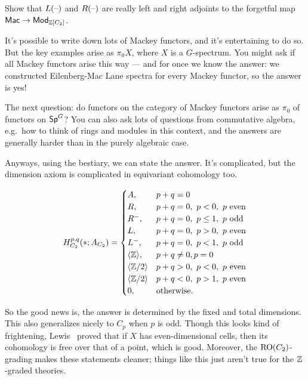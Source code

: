 \begin{ex}
Show that $L(\text{--})$ and $R(\text{--})$ are really left and right adjoints to the forgetful map
$\mathsf{Mac}\to\mathsf{Mod}_{\mathbb Z[C_2]}$.
\end{ex}
It's possible to write down lots of Mackey functors, and it's entertaining to do so. But the key examples arise as
$\pi_0 X$, where $X$ is a $G$-spectrum. You might ask if all Mackey functors arise this way --- and for once we
know the answer: we constructed Eilenberg-Mac Lane spectra for every Mackey functor, so the answer is yes!

The next question: do functors on the category of Mackey functors arise as $\pi_0$ of functors on $\mathsf{Sp}^G$? You can
also ask lots of questions from commutative algebra, e.g.\ how to think of rings and modules in this context, and
the answers are generally harder than in the purely algebraic case.

Anyways, using the bestiary, we can state the answer. It's complicated, but the dimension axiom is complicated in
equivariant cohomology too.
\begin{thm}
\[H_{C_2}^{p,q}(*; A_{C_2}) = \begin{cases}
	A, &p+q = 0\\
	R, &p+q = 0,\ p < 0,\ p\text{\rm{} even}\\
	R^-, &p+q = 0,\ p \le 1,\ p\text{\rm{} odd}\\
	L, &p+q = 0,\ p > 0,\ p\text{\rm{} even}\\
	L^-, &p+q = 0,\ p < 1,\ p\text{\rm{} odd}\\
	\langle\mathbb Z\rangle, &p+q\ne 0, p = 0\\
	\langle\mathbb Z/2\rangle & p+q > 0,\ p < 0,\ p\text{\rm{} even}\\
	\langle\mathbb Z/2\rangle & p+q < 0,\ p > 1,\ p\text{\rm{} even}\\
	0, &\text{\rm otherwise.}
\end{cases}\]
\end{thm}
So the good news is, the answer is determined by the fixed and total dimensions. This also generalizes nicely to
$C_p$ when $p$ is odd. Though this looks kind of frightening, Lewis~\cite{Lew88} proved that if $X$ has
even-dimensional cells, then its cohomology is free over that of a point, which is good. Moreover, the
$\mathrm{RO}(C_2)$-grading makes these statements cleaner; things like this just aren't true for the $\mathbb Z$-graded theories.

